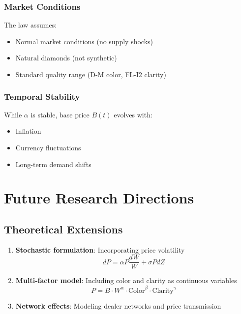 \documentclass[12pt,a4paper]{article}
\theoremstyle{definition}
\theoremstyle{remark}
\begin{document}
\subsubsection{Market Conditions}
The law assumes:
\begin{itemize}
\item Normal market conditions (no supply shocks)
\item Natural diamonds (not synthetic)
\item Standard quality range (D-M color, FL-I2 clarity)
\end{itemize}

\subsubsection{Temporal Stability}
While $\alpha$ is stable, base price $B(t)$ evolves with:
\begin{itemize}
\item Inflation
\item Currency fluctuations
\item Long-term demand shifts
\end{itemize}

\section{Future Research Directions}

\subsection{Theoretical Extensions}

\begin{enumerate}
\item \textbf{Stochastic formulation}: Incorporating price volatility
\begin{equation}
dP = \alpha P \frac{dW}{W} + \sigma P dZ
\end{equation}

\item \textbf{Multi-factor model}: Including color and clarity as continuous variables
\begin{equation}
P = B \cdot W^{\alpha} \cdot \text{Color}^{\beta} \cdot \text{Clarity}^{\gamma}
\end{equation}

\item \textbf{Network effects}: Modeling dealer networks and price transmission
\end{enumerate}
\end{document}
